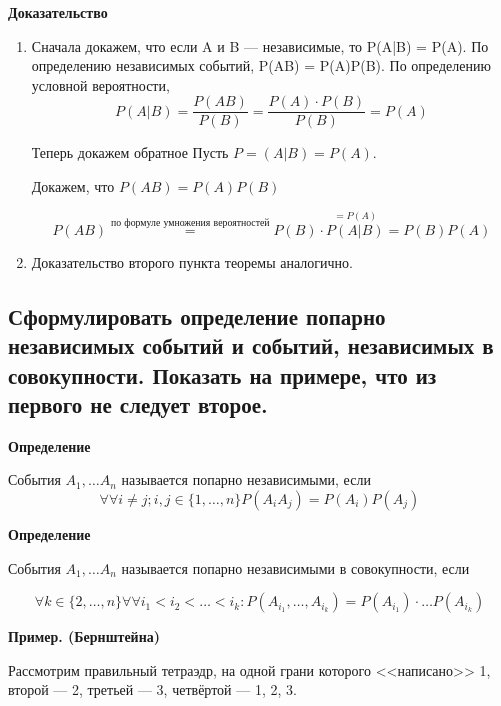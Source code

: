 \textbf{Доказательство}

\begin{enumerate}
	\item Сначала докажем, что если A и B --- независимые, то P(A|B) = P(A).
	По определению независимых событий, P(AB) = P(A)P(B). По определению условной вероятности, 
	\begin{equation}
		P(A|B) = \frac{P(AB)}{P(B)} = \frac{P(A) \cdot P(B)}{P(B)} = P(A)
	\end{equation}

	Теперь докажем обратное
	Пусть $P =(A|B) = P(A)$. 
	
	Докажем, что $P(AB) = P(A)P(B)$
	
	\begin{equation}
		P(AB) \stackrel{\text{по формуле умножения вероятностей}}{=} P(B) \cdot \stackrel{=P(A)}{P(A|B)} = P(B)P(A)
	\end{equation}

	\item Доказательство второго пункта теоремы аналогично.
\end{enumerate}

\subsection{Сформулировать определение попарно независимых событий и событий, независимых в совокупности. Показать на примере, что из первого не следует второе.}

\textbf{Определение}

События $A_1, \dots A_n$ называется попарно независимыми, если
\begin{equation}
	\forall \forall i \neq j; i,j \in \{1, \dots, n\} P(A_i A_j) = P(A_i)P(A_j)
\end{equation}


\textbf{Определение}

События $A_1, \dots A_n$ называется попарно независимыми в совокупности, если

\begin{equation}
	\forall k \in \{2, \dots, n\} \forall \forall i_1 < i_2 < \dots < i_k: P(A_{i_1}, \dots, A_{i_k}) = P(A_{i_1}) \cdot \dots P(A_{i_k})
\end{equation}

\textbf{Пример. (Бернштейна)}

Рассмотрим правильный тетраэдр, на одной грани которого <<написано>> 1, второй --- 2, третьей --- 3, четвёртой --- 1, 2, 3.

